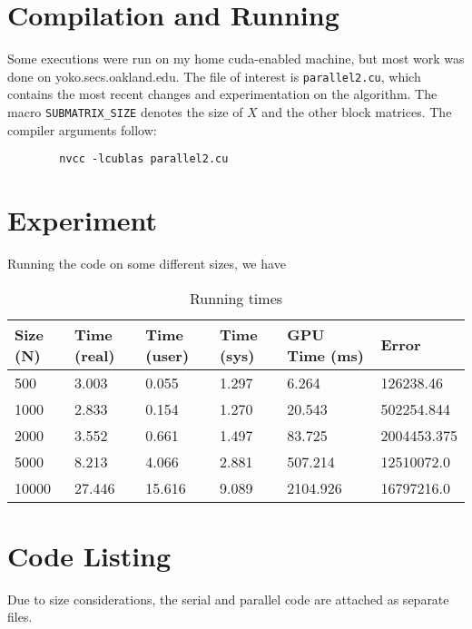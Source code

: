 \documentclass{amsart}
\begin{document}
	\section{Compilation and Running}
	Some executions were run on my home cuda-enabled machine, but most work was done on yoko.secs.oakland.edu. The file of interest is \texttt{parallel2.cu}, which contains the most recent changes and experimentation on the algorithm. The macro \texttt{SUBMATRIX\_SIZE} denotes the size of $X$ and the other block matrices. The compiler arguments follow:
	\begin{center}
		\begin{verbatim}
		nvcc -lcublas parallel2.cu
		\end{verbatim}
	\end{center}
		
	\section{Experiment}
	Running the code on some different sizes, we have
	
	\begin{table}[h]
		\centering
		\caption{Running times}
		\label{run}
		\begin{tabular}{llllll}
			Size (N) & Time (real) & Time (user) & Time (sys) & GPU Time (ms) & Error       \\ \hline
			500      & 3.003       & 0.055       & 1.297      & 6.264         & 126238.46   \\
			1000     & 2.833       & 0.154       & 1.270      & 20.543        & 502254.844  \\
			2000     & 3.552       & 0.661       & 1.497      & 83.725        & 2004453.375 \\
			5000     & 8.213       & 4.066       & 2.881      & 507.214       & 12510072.0  \\
			10000    & 27.446      & 15.616      & 9.089      & 2104.926      & 16797216.0 
		\end{tabular}
	\end{table}

	\section{Code Listing}
	Due to size considerations, the serial and parallel code are attached as separate files.
	
\end{document}
